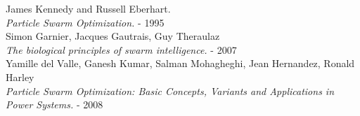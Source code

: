 \documentclass[journal,onecolumn]{IEEEtran}
\begin{document}
\begin{thebibliography}{1}

  James Kennedy and Russell Eberhart. \\
  \textit{Particle Swarm Optimization.} - 1995
\\
  Simon Garnier, Jacques Gautrais, Guy Theraulaz\\
  \textit{The biological principles of swarm intelligence.} - 2007
\\
  Yamille del Valle, Ganesh Kumar, Salman Mohagheghi, Jean Hernandez, Ronald Harley\\
  \textit{Particle Swarm Optimization: Basic Concepts, Variants and Applications in Power Systems.} - 2008

\end{thebibliography}
\end{document}
